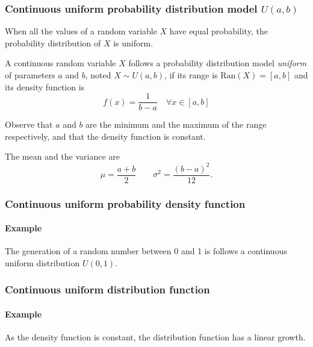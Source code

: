 \begin{frame}
\frametitle{Continuous uniform probability distribution model $U(a,b)$}
When all the values of a random variable $X$ have equal probability, the probability distribution of $X$ is uniform.

\begin{definition}
A continuous random variable $X$ follows a probability distribution model \emph{uniform} of parameters $a$ and
$b$, noted $X\sim U(a,b)$, if its range is $\mbox{Ran}(X) = [a,b]$ and its density function is
\[
f(x)= \frac{1}{b-a}\quad \forall x\in [a,b]
\]
\end{definition}

Observe that $a$ and $b$ are the minimum and the maximum of the range respectively, and that the density function is
constant. 

The mean and the variance are
\[
\mu = \frac{a+b}{2}\qquad \sigma^2=\frac{(b-a)^2}{12}.
\]
\end{frame}


\begin{frame}
\frametitle{Continuous uniform probability density function}
\framesubtitle{Example}

The generation of a random number between 0 and 1 is follows a continuous uniform distribution $U(0,1)$.
\begin{center}
\end{center}
\end{frame}


\begin{frame}
\frametitle{Continuous uniform distribution function}
\framesubtitle{Example}
As the density function is constant, the distribution function has a linear growth. 
\begin{center}
\end{center}
\end{frame}


